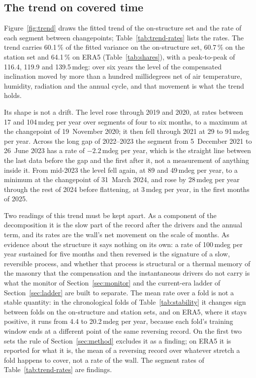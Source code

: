 \documentclass[11pt,a4paper]{article}
\begin{document}
\subsection{The trend on covered time}

Figure~\ref{fig:trend} draws the fitted trend of the on-structure set and the
rate of each segment between changepoints; Table~\ref{tab:trend-rates} lists
the rates. The trend carries 60.1\,\% of the fitted variance on the
on-structure set, 60.7\,\% on the station set and 64.1\,\% on ERA5
(Table~\ref{tab:shares}), with a peak-to-peak of 116.4, 119.9 and
139.5\,mdeg: over six years the level of the compensated inclination moved by
more than a hundred millidegrees net of air temperature, humidity, radiation
and the annual cycle, and that movement is what the trend holds.

Its shape is not a drift. The level rose through 2019 and 2020, at rates
between 17 and 104\,mdeg per year over segments of four to six months, to a
maximum at the changepoint of 19~November 2020; it then fell through 2021 at
29 to 91\,mdeg per year. Across the long gap of 2022--2023 the segment from
5~December 2021 to 26~June 2023 has a rate of $-2.2$\,mdeg per year, which is
the straight line between the last data before the gap and the first after
it, not a measurement of anything inside it. From mid-2023 the level fell
again, at 89 and 49\,mdeg per year, to a minimum at the changepoint of
31~March 2024, and rose by 28\,mdeg per year through the rest of 2024 before
flattening, at 3\,mdeg per year, in the first months of 2025.

Two readings of this trend must be kept apart. As a component of the
decomposition it is the slow part of the record after the drivers and the
annual term, and its rates are the wall's net movement on the scale of months.
As evidence about the structure it says nothing on its own: a rate of
100\,mdeg per year sustained for five months and then reversed is the
signature of a slow, reversible process, and whether that process is
structural or a thermal memory of the masonry that the compensation and the
instantaneous drivers do not carry is what the monitor of
Section~\ref{sec:monitor} and the current-era ladder of
Section~\ref{sec:ladder} are built to separate. The mean rate over a fold is
not a stable quantity: in the chronological folds of
Table~\ref{tab:stability} it changes sign between folds on the on-structure
and station sets, and on ERA5, where it stays positive, it runs from 4.4 to
20.2\,mdeg per year, because each fold's training window ends at a different
point of the same reversing record. On the first two sets the rule of
Section~\ref{sec:method} excludes it as a finding; on ERA5 it is reported for
what it is, the mean of a reversing record over whatever stretch a fold
happens to cover, not a rate of the wall. The segment rates of
Table~\ref{tab:trend-rates} are findings.
\end{document}
